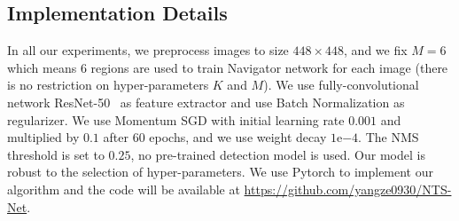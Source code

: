 \documentclass[runningheads]{llncs}
\begin{document}
\subsection{Implementation Details}
In all our experiments, we preprocess images to size $448 \times 448$, and we fix $M=6$ which means $6$ regions are used to train Navigator network for each image (there is no restriction on hyper-parameters $K$ and $M$). We use fully-convolutional network ResNet-50~\cite{he2016deep} as feature extractor and use Batch Normalization as regularizer. We use Momentum SGD with initial learning rate $0.001$ and multiplied by $0.1$ after $60$ epochs, and we use weight decay $1\mathrm{e}{-4}$. The NMS threshold is set to $0.25$, no pre-trained detection model is used. Our model is robust to the selection of hyper-parameters. We use Pytorch to implement our algorithm and the code will be available at \url{https://github.com/yangze0930/NTS-Net}.
\end{document}

